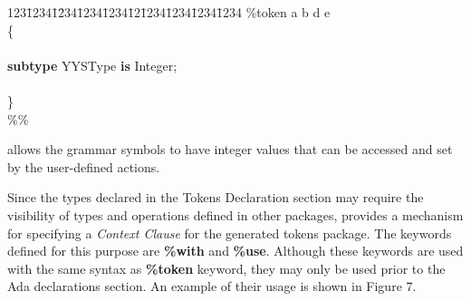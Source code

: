\begin{tabbing}
123\=1234\=1\=234\=1234\=1234\=12\=1234\=1234\=1234\=1234 \kill
\%token a b d e\\
\{\\
\\
\>  {\bf subtype} YYSType {\bf is} Integer;\\
\\
\}\\
\%\%
\end{tabbing}

\noindent allows the grammar symbols to have integer values
that can be accessed and set by the user-defined actions.

Since the types declared in the Tokens Declaration section may require the
visibility of types and operations defined in other packages, \ayacc provides
a mechanism for specifying a {\it Context Clause} for the generated tokens
package.  The keywords defined for this purpose are {\bf \%with} and
{\bf \%use}.  Although these keywords are used with the same syntax as
{\bf \%token} keyword, they may only be used prior to the Ada declarations
section.  An example of their usage is shown in Figure 7.
\newpage
\noindent\hspace{-0.05in}\hrulefill\hspace{0.0in}\\
\vspace{-0.2in}
